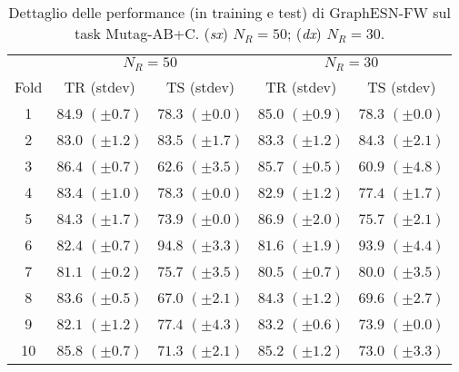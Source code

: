 \begin{table}[tbph]
\footnotesize
\caption[Dettaglio performance: GraphESN-FW su Mutag-AB+C]{Dettaglio delle performance (in training e test) di GraphESN-FW sul task Mutag-AB+C. (\emph{sx}) $N_R=50$; (\emph{dx}) $N_R=30$.}
\label{app:esp:Mutag-ABC-FW}
\centering
\begin{tabular}{c*{4}{c}}
\toprule
& \multicolumn{2}{c}{$N_R=50$} & \multicolumn{2}{c}{$N_R=30$}\\
Fold & TR (stdev) & TS (stdev) & TR (stdev) & TS (stdev)\\
\midrule
1 & $84.9$ $(\pm 0.7)$ & $78.3$ $(\pm 0.0)$ & $85.0$ $(\pm 0.9)$ & $78.3$ $(\pm 0.0)$\\
2 & $83.0$ $(\pm 1.2)$ & $83.5$ $(\pm 1.7)$ & $83.3$ $(\pm 1.2)$ & $84.3$ $(\pm 2.1)$\\
3 & $86.4$ $(\pm 0.7)$ & $62.6$ $(\pm 3.5)$ & $85.7$ $(\pm 0.5)$ & $60.9$ $(\pm 4.8)$\\
4 & $83.4$ $(\pm 1.0)$ & $78.3$ $(\pm 0.0)$ & $82.9$ $(\pm 1.2)$ & $77.4$ $(\pm 1.7)$\\
5 & $84.3$ $(\pm 1.7)$ & $73.9$ $(\pm 0.0)$ & $86.9$ $(\pm 2.0)$ & $75.7$ $(\pm 2.1)$\\
6 & $82.4$ $(\pm 0.7)$ & $94.8$ $(\pm 3.3)$ & $81.6$ $(\pm 1.9)$ & $93.9$ $(\pm 4.4)$\\
7 & $81.1$ $(\pm 0.2)$ & $75.7$ $(\pm 3.5)$ & $80.5$ $(\pm 0.7)$ & $80.0$ $(\pm 3.5)$\\
8 & $83.6$ $(\pm 0.5)$ & $67.0$ $(\pm 2.1)$ & $84.3$ $(\pm 1.2)$ & $69.6$ $(\pm 2.7)$\\
9 & $82.1$ $(\pm 1.2)$ & $77.4$ $(\pm 4.3)$ & $83.2$ $(\pm 0.6)$ & $73.9$ $(\pm 0.0)$\\
10 & $85.8$ $(\pm 0.7)$ & $71.3$ $(\pm 2.1)$ & $85.2$ $(\pm 1.2)$ & $73.0$ $(\pm 3.3)$\\
\bottomrule
\end{tabular}
\end{table}



